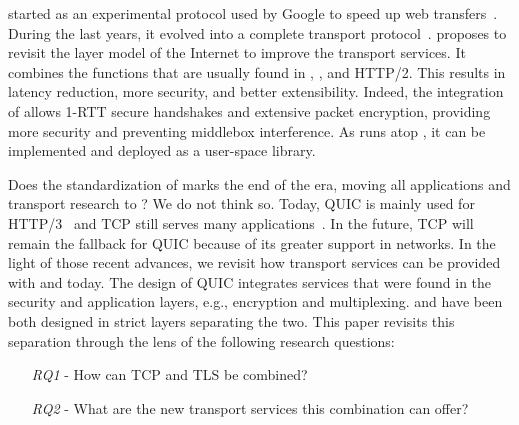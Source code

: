 \quic started as an experimental protocol used by Google to speed up web
transfers~\cite{roskind2013quic,langley2017quic}. During the last years, it
evolved into a complete transport protocol~\cite{rfc9000}.
\quic proposes to revisit the layer model of the Internet to improve the transport services. It combines the functions that are usually found in \tcp, \tls, and HTTP/2. This results in latency reduction, more security, and better extensibility. Indeed, the integration of  allows 1-RTT secure handshakes and extensive packet encryption, providing more security and preventing middlebox interference.
As \quic runs atop \udp, it can be implemented and deployed as a user-space library.

Does the standardization of \quic marks the end of the \tcp era, moving
all applications and transport research to \quic?  We do not think
so. Today, QUIC is mainly used for HTTP/3~\cite{http3} and TCP still serves many applications~\cite{covid19,fiveyears}.
In the future, TCP will remain the fallback for QUIC because of its greater support
in networks.
%
In the light of those recent advances, we revisit how transport services can be
provided with \tcp and \tls today. The design of QUIC integrates services
that were found in the security and application layers, e.g., encryption and multiplexing.
\tcp and \tls have been both designed in strict layers separating the two.
This paper revisits this separation through the lens of the following research questions:

\begin{itemize}
	\item[{\small{\textit{RQ1}}} -] How can TCP and TLS be combined?
	\item[{\small{\textit{RQ2}}} -] What are the new transport services this combination can offer?
\end{itemize}

